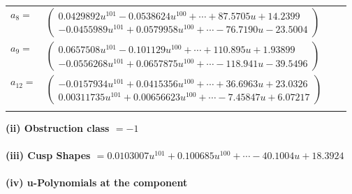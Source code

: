 \documentclass[1p]{elsarticle_modified}
\theoremstyle{definition}
\begin{document}
\begin{tabular}{m{7pt} m{180pt} m{7pt} m{180pt} }
\flushright $a_{8}=$&$\begin{pmatrix}0.0429892 u^{101}-0.0538624 u^{100}+\cdots+87.5705 u+14.2399\\-0.0455989 u^{101}+0.0579958 u^{100}+\cdots-76.7190 u-23.5004\end{pmatrix}$ \\
\flushright $a_{9}=$&$\begin{pmatrix}0.0657508 u^{101}-0.101129 u^{100}+\cdots+110.895 u+1.93899\\-0.0556268 u^{101}+0.0657875 u^{100}+\cdots-118.941 u-39.5496\end{pmatrix}$ \\
\flushright $a_{12}=$&$\begin{pmatrix}-0.0157934 u^{101}+0.0415356 u^{100}+\cdots+36.6963 u+23.0326\\0.00311735 u^{101}+0.00656623 u^{100}+\cdots-7.45847 u+6.07217\end{pmatrix}$\\&\end{tabular}
\flushleft \textbf{(ii) Obstruction class $= -1$}\\~\\
\flushleft \textbf{(iii) Cusp Shapes $= 0.0103007 u^{101}+0.100685 u^{100}+\cdots-40.1004 u+18.3924$}\\~\\
\newpage\renewcommand{\arraystretch}{1}
\flushleft \textbf{(iv) u-Polynomials at the component}\newline \\
\end{document}

